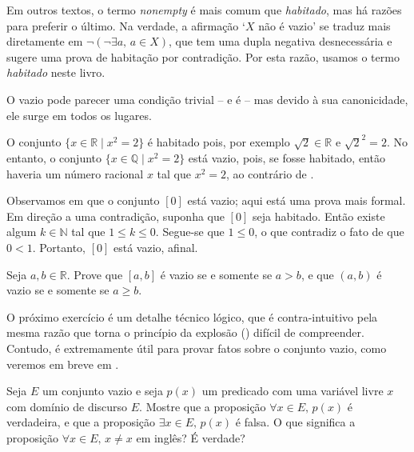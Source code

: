 Em outros textos, o termo \textit{nonempty} é mais comum que \textit{habitado}, mas há razões para preferir o último. Na verdade, a afirmação `$X$ não é vazio' se traduz mais diretamente em $\neg(\neg \exists a,\, a \in X)$, que tem uma dupla negativa desnecessária e sugere uma prova de habitação por contradição. Por esta razão, usamos o termo \textit{habitado} neste livro.

O vazio pode parecer uma condição trivial – e é – mas devido à sua canonicidade, ele surge em todos os lugares.

\begin{example}
O conjunto $\{ x \in \mathbb{R} \mid x^2 = 2 \}$ é habitado pois, por exemplo $\sqrt{2} \in \mathbb{R}$ e $\sqrt{2} ^2 = 2$. No entanto, o conjunto $\{ x \in \mathbb{Q} \mid x^2 = 2 \}$ está vazio, pois, se fosse habitado, então haveria um número racional $x$ tal que $x^2 = 2$, ao contrário de .
\end{example}

\begin{example}
Observamos em  que o conjunto $[0]$ está vazio; aqui está uma prova mais formal. Em direção a uma contradição, suponha que $[0]$ seja habitado. Então existe algum $k \in \mathbb{N}$ tal que $1 \le k \le 0$. Segue-se que $1 \le 0$, o que contradiz o fato de que $0<1$. Portanto, $[0]$ está vazio, afinal.
\end{example}

\begin{exercise}
Seja $a,b \in \mathbb{R}$. Prove que $[a,b]$ é vazio se e somente se $a > b$, e que $(a,b)$ é vazio se e somente se $a \ge b$.
\end{exercise}

O próximo exercício é um detalhe técnico lógico, que é contra-intuitivo pela mesma razão que torna o princípio da explosão () difícil de compreender. Contudo, é extremamente útil para provar fatos sobre o conjunto vazio, como veremos em breve em .

\begin{exercise}
Seja $E$ um conjunto vazio e seja $p(x)$ um predicado com uma variável livre $x$ com domínio de discurso $E$. Mostre que a proposição $\forall x \in E,\, p(x)$ é verdadeira, e que a proposição $\exists x \in E,\, p(x)$ é falsa. O que significa a proposição $\forall x \in E,\, x \ne x$ em inglês? É verdade?
\end{exercise}

